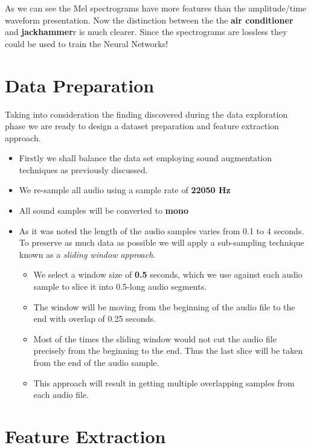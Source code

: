 As we can see the Mel spectrograms have more features than the
amplitude/time waveform presentation. Now the distinction between the
the \textbf{air conditioner} and \textbf{jackhammer}r is much clearer.
Since the spectrograms are lossless they could be used to train the
Neural Networks!

\hypertarget{data-preparation}{%
\section{Data Preparation}\label{data-preparation}}

Taking into consideration the finding discovered during the data
exploration phase we are ready to design a dataset preparation and
feature extraction approach.

\begin{itemize}
\item
  Firstly we shall balance the data set employing sound augmentation
  techniques as previously discussed.
\item
  We re-sample all audio using a sample rate of \textbf{22050 Hz}
\item
  All sound samples will be converted to \textbf{mono}
\item
  As it was noted the length of the audio samples varies from 0.1 to 4
  seconds. To preserve as much data as possible we will apply a
  sub-sampling technique known as a \emph{sliding window approach}.

  \begin{itemize}
  \tightlist
  \item
    We select a window size of \textbf{0.5} seconds, which we use
    against each audio sample to slice it into 0.5-long audio segments.
  \item
    The window will be moving from the beginning of the audio file to
    the end with overlap of 0.25 seconds.
  \item
    Most of the times the sliding window would not cut the audio file
    precisely from the beginning to the end. Thus the last slice will be
    taken from the end of the audio sample.
  \item
    This approach will result in getting multiple overlapping samples
    from each audio file.
  \end{itemize}
\end{itemize}

\hypertarget{feature-extraction}{%
\section{Feature Extraction}\label{feature-extraction}}

